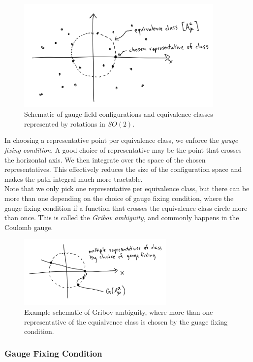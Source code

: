 \begin{figure}[H]
	\centering
	\includegraphics[width=4in]{images/so2schematic.png}
	\caption*{Schematic of gauge field configurations and equivalence classes represented by rotations in $SO(2)$.}
\end{figure}

\noindent In choosing a representative point per equivalence class, we enforce the \textit{gauge fixing condition}. A good choice of representative may be the point that crosses the horizontal axis. We then integrate over the space of the chosen representatives. This effectively reduces the size of the configuration space and makes the path integral much more tractable. \\

\noindent Note that we only pick one representative per equivalence class, but there can be more than one depending on the choice of gauge fixing condition, where the gauge fixing condition if a function that crosses the equivalence class circle more than once. This is called the \textit{Gribov ambiguity}, and commonly happens in the Coulomb gauge. \\

\begin{figure}[H]
	\centering
	\includegraphics[width=3in]{images/gribov.png}
	\caption*{Example schematic of Gribov ambiguity, where more than one representative of the equialvence class is chosen by the guage fixing condition.}
\end{figure}

\subsubsection*{Gauge Fixing Condition}

